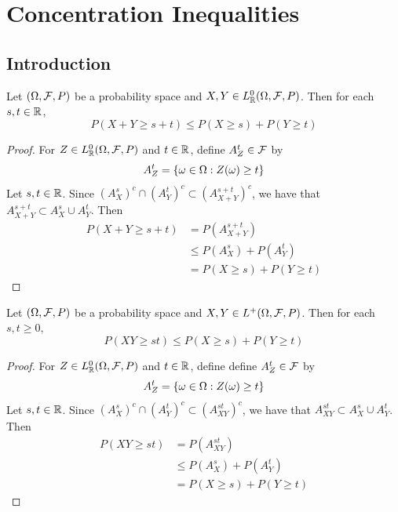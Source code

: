 \documentclass{book}
\begin{document}
	
	
	
	
	
	
	
	
	
	
	
	
	
	
	
	
	
	
	
	
	
	
	
	
	
	
	\newpage
	\chapter{Concentration Inequalities}
	
	\section{Introduction}
	
	\begin{ex}
		Let $(\Omega, \mathcal{F}, P)$ be a probability space and $X,Y \in L^0_{\mathbb{R}}(\Omega, \mathcal{F}, P)$. Then for each $s, t \in \mathbb{R}$, 
		$$P(X + Y \geq s + t) \leq P(X \geq s) + P(Y \geq t) $$ 
	\end{ex}

	\begin{proof}
		For $Z \in L^0_{\mathbb{R}}(\Omega, \mathcal{F}, P)$ and $t \in \mathbb{R}$, define $A_Z^t \in \mathcal{F}$ by 
		$$A_Z^t = \{\omega \in \Omega : Z(\omega) \geq t\}$$ 
		Let $s,t \in \mathbb{R}$. Since $(A_X^s)^c \cap (A_Y^t)^c \subset (A_{X+Y}^{s+t})^c$, we have that $A_{X+Y}^{s+t} \subset A_X^s \cup A_Y^t$. Then 
		\begin{align*}
			P(X + Y \geq s + t)
			& = P(A_{X+Y}^{s+t}) \\
			& \leq P(A_X^s) + P(A_Y^t) \\
			& = P(X \geq s) + P(Y \geq t)
		\end{align*} 
	\end{proof}

	\begin{ex}
		Let $(\Omega, \mathcal{F}, P)$ be a probability space and $X,Y \in L^+(\Omega, \mathcal{F}, P)$. Then for each $s, t \geq 0$, 
		$$P(XY \geq st) \leq P(X \geq s) + P(Y \geq t) $$ 
	\end{ex}
	
	\begin{proof}
		For $Z \in L^0_{\mathbb{R}}(\Omega, \mathcal{F}, P)$ and $t \in \mathbb{R}$, define define $A_Z^t \in \mathcal{F}$ by 
		$$A_Z^t = \{\omega \in \Omega : Z(\omega) \geq t\}$$ 
		Let $s,t \in \mathbb{R}$. Since $(A_X^s)^c \cap (A_Y^t)^c \subset (A_{XY}^{st})^c$, we have that $A_{XY}^{st} \subset A_X^s \cup A_Y^t$. Then 
		\begin{align*}
			P(XY \geq st)
			& = P(A_{XY}^{st}) \\
			& \leq P(A_X^s) + P(A_Y^t) \\
			& = P(X \geq s) + P(Y \geq t)
		\end{align*} 
	\end{proof}
\end{document}
